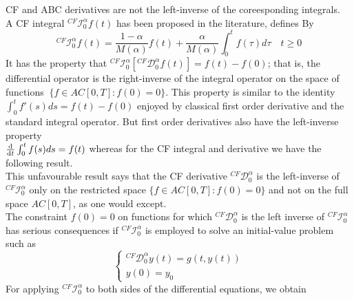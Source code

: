 \documentclass[twoside]{book}
\begin{document}
{CF and ABC derivatives are not the left-inverse of the coreesponding integrals.\\
A CF integral $^{CF}\mathscr{I}^{\alpha}_{0} f(t)$ has been proposed in the literature, defines By
\begin{equation}
    \label{CF integral}
    ^{CF}\mathscr{I}^{\alpha}_{0}f(t) = \frac{1-\alpha}{M(\alpha)}f(t) + \frac{\alpha}{M(\alpha)}\int_0^t f(\tau) d\tau \quad t \geq 0
\end{equation}
It has the property that $^{CF}\mathscr{I}^{\alpha}_{0}[^{CF}\mathcal{D}^{\alpha}_{0}f(t)] = f(t) - f(0)$; that is, the differential operator is the right-inverse of the integral operator on the space of functions $~\{f \in AC[0,T] : f(0) = 0 \}$. This property is similar to the identity $\int_0^t f'(s) ds = f(t) - f(0) $ enjoyed by classical first order derivative and the standard integral operator. But first order derivatives also have the left-inverse property \\ $\dv{}{t} \int_0^t f(s) ds = f(t)$ whereas for the CF integral and derivative we have the following result.\\
This unfavourable result says that the CF derivative $^{CF}\mathcal{D}^{\alpha}_{0}$ is the left-inverse of $^{CF}\mathscr{I}^{\alpha}_0$ only on the restricted space $\{f \in AC[0,T] : f(0)=0\}$ and not on the full space $AC[0,T]$, as one would except.\\
The constraint $f(0)=0$ on functions for which $^{CF}\mathcal{D}^{\alpha}_0$ is  the left inverse of $^{CF}\mathscr{I}^{\alpha}_0$ has serious consequences if $^{CF}\mathscr{I}^{\alpha}_0$ is employed to solve an initial-value problem such as
\begin{equation}
    \label{DE1}
    \begin{cases}
        ^{CF}\mathcal{D}^{\alpha}_{0} y(t) = g(t,y(t)) \\
        y(0) =y_0
    \end{cases}
\end{equation}
For applying $^{CF}\mathscr{I}^{\alpha}_{0}$ to both sides of the differential equations, we obtain
\begin{equation}

\end{equation}}
\end{document}

